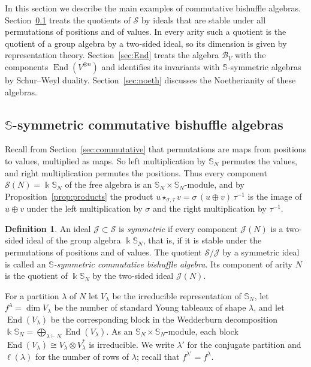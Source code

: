 \documentclass[11pt]{amsart}
\theoremstyle{definition}
\newtheorem{definition}[theorem]{Definition}
\theoremstyle{remark}
\newcommand{\bS}{\mathbb{S}}
\newcommand{\kk}{\Bbbk}
\newcommand{\cB}{\mathcal{B}}
\newcommand{\cJ}{\mathscr{J}}
\newcommand{\cS}{\mathscr{S}}
\newcommand{\End}{\operatorname{End}}
\begin{document}
In this section we describe the main examples of commutative bishuffle algebras. Section~\ref{sec:symdef} treats the quotients of $\cS$ by ideals that are stable under all permutations of positions and of values. In every arity such a quotient is the quotient of a group algebra by a two-sided ideal, so its dimension is given by representation theory. Section~\ref{sec:End} treats the algebra $\cB_V$ with the components $\End(V^{\otimes n})$ and identifies its invariants with $\bS$-symmetric algebras by Schur--Weyl duality. Section~\ref{sec:noeth} discusses the Noetherianity of these algebras.

\subsection{\texorpdfstring{$\bS$}{S}-symmetric commutative bishuffle algebras}\label{sec:symdef}

Recall from Section~\ref{sec:commutative} that permutations are maps from positions to values, multiplied as maps. So left multiplication by $\bS_N$ permutes the values, and right multiplication permutes the positions. Thus every component $\cS(N)=\kk\bS_N$ of the free algebra is an $\bS_N\times\bS_N$-module, and by Proposition~\ref{prop:products} the product $u\star_{\sigma,\tau}v=\sigma\,(u\oplus v)\,\tau^{-1}$ is the image of $u\oplus v$ under the left multiplication by $\sigma$ and the right multiplication by $\tau^{-1}$.

\begin{definition}\label{def:symmetric}
An ideal $\cJ\subset\cS$ is \emph{symmetric} if every component $\cJ(N)$ is a two-sided ideal of the group algebra $\kk\bS_N$, that is, if it is stable under the permutations of positions and of values. The quotient $\cS/\cJ$ by a symmetric ideal is called an \emph{$\bS$-symmetric commutative bishuffle algebra}. Its component of arity $N$ is the quotient of $\kk\bS_N$ by the two-sided ideal $\cJ(N)$.
\end{definition}

For a partition $\lambda$ of $N$ let $V_\lambda$ be the irreducible representation of $\bS_N$, let $f^\lambda=\dim V_\lambda$ be the number of standard Young tableaux of shape $\lambda$, and let $\End(V_\lambda)$ be the corresponding block in the Wedderburn decomposition $\kk\bS_N=\bigoplus_{\lambda\vdash N}\End(V_\lambda)$. As an $\bS_N\times\bS_N$-module, each block $\End(V_\lambda)\cong V_\lambda\otimes V_\lambda^*$ is irreducible. We write $\lambda'$ for the conjugate partition and $\ell(\lambda)$ for the number of rows of $\lambda$; recall that $f^{\lambda'}=f^\lambda$.
\end{document}
